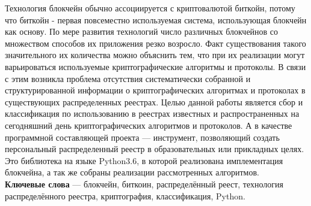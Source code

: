 Технология блокчейн обычно ассоциируется с криптовалютой биткойн, потому что
биткойн - первая повсеместно используемая система, использующая блокчейн как
основу. По мере развития технологий число различных блокчейнов со множеством
способов их приложения резко возросло. Факт существования такого значительного
их количества можно объяснить тем, что при их реализации могут варьироваться
используемые криптографические алгоритмы и протоколы. В связи с этим возникла
проблема отсутствия систематически собранной и структурированной информации о
криптографических алгоритмах и протоколах в существующих распределенных
реестрах. Целью данной работы является сбор и классификация по использованию в
реестрах известных и распространенных на сегодняшний день криптографических
алгоритмов и протоколов. А в качестве программной составляющей проекта ---
инструмент, позволяющий создать персональный распределенный реестр в
образовательных или прикладных целях. Это библиотека на языке Python3.6, в
которой реализована имплементация блокчейна, а так же собраны реализации
рассмотренных алгоритмов.\\

\textbf{Ключевые слова} --- блокчейн, биткоин, распределённый реест,
технология распределённого реестра, криптография, классификация, Python.
